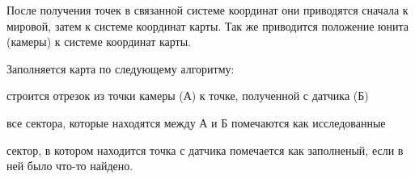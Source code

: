 После получения точек в связанной системе координат они приводятся
сначала к мировой, затем к системе координат карты.
Так же приводится положение юнита (камеры) к системе координат карты.

Заполняется карта по следующему алгоритму:
\begin{mintemize}
    \item строится отрезок из точки камеры (А) к точке, полученной с датчика (Б)
    \item все сектора, которые находятся между А и Б помечаются как исследованные
    \item сектор, в котором находится точка с датчика помечается как заполненый,
        если в ней было что-то найдено.
\end{mintemize}
